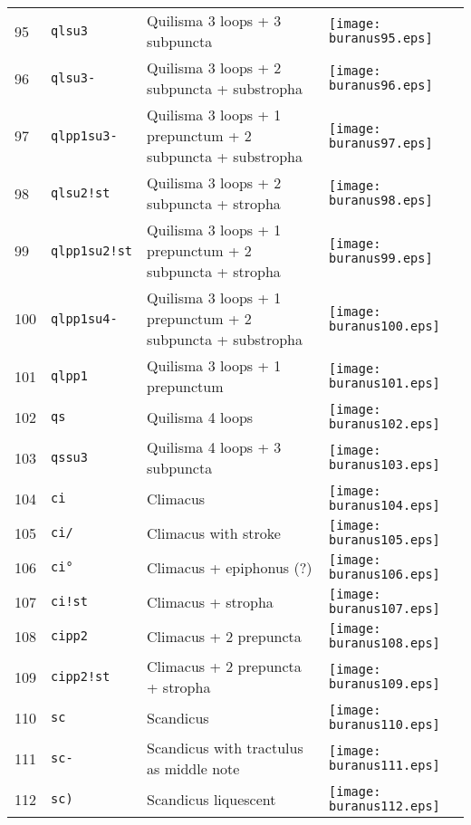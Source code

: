 \documentclass{scrarticle}
\begin{document}
\begin{longtable}{l|l|l|l}
95 & \texttt{qlsu3} & Quilisma 3 loops + 3 subpuncta & \texttt{[image: buranus95.eps]} \\
96 & \texttt{qlsu3-} & Quilisma 3 loops + 2 subpuncta + substropha & \texttt{[image: buranus96.eps]} \\
97 & \texttt{qlpp1su3-} & Quilisma 3 loops + 1 prepunctum + 2 subpuncta + substropha & \texttt{[image: buranus97.eps]} \\
98 & \texttt{qlsu2!st} & Quilisma 3 loops + 2 subpuncta + stropha & \texttt{[image: buranus98.eps]} \\
99 & \texttt{qlpp1su2!st} & Quilisma 3 loops + 1 prepunctum + 2 subpuncta + stropha & \texttt{[image: buranus99.eps]} \\
100 & \texttt{qlpp1su4-} & Quilisma 3 loops + 1 prepunctum + 2 subpuncta + substropha & \texttt{[image: buranus100.eps]} \\
101 & \texttt{qlpp1} & Quilisma 3 loops + 1 prepunctum & \texttt{[image: buranus101.eps]} \\
102 & \texttt{qs} & Quilisma 4 loops & \texttt{[image: buranus102.eps]} \\
103 & \texttt{qssu3} & Quilisma 4 loops + 3 subpuncta & \texttt{[image: buranus103.eps]} \\
104 & \texttt{ci} & Climacus & \texttt{[image: buranus104.eps]} \\
105 & \texttt{ci/} & Climacus with stroke & \texttt{[image: buranus105.eps]} \\
106 & \texttt{ci°} & Climacus + epiphonus (?) & \texttt{[image: buranus106.eps]} \\
107 & \texttt{ci!st} & Climacus + stropha & \texttt{[image: buranus107.eps]} \\
108 & \texttt{cipp2} & Climacus + 2 prepuncta & \texttt{[image: buranus108.eps]} \\
109 & \texttt{cipp2!st} & Climacus + 2 prepuncta + stropha & \texttt{[image: buranus109.eps]} \\
110 & \texttt{sc} & Scandicus & \texttt{[image: buranus110.eps]} \\
111 & \texttt{sc-} & Scandicus with tractulus as middle note & \texttt{[image: buranus111.eps]} \\
112 & \texttt{sc)} & Scandicus liquescent & \texttt{[image: buranus112.eps]} \\\end{longtable}
\end{document}
